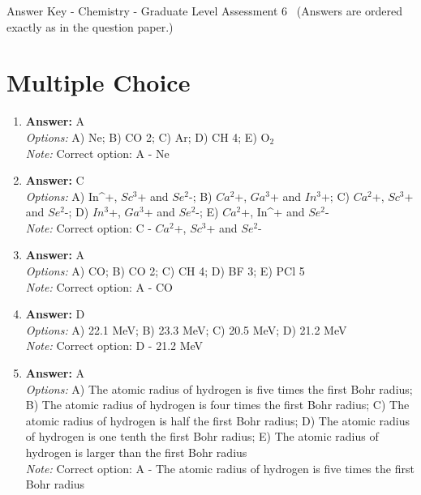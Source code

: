 \documentclass[12pt]{article}
\begin{document}
\begin{center}
Answer Key - Chemistry - Graduate Level Assessment 6 \
\small (Answers are ordered exactly as in the question paper.)
\end{center}

\section*{Multiple Choice}
\begin{enumerate}[label=\arabic*.]
\item \textbf{Answer:} A
\\ \textit{Options:} A) Ne; B) CO 2; C) Ar; D) CH 4; E) O$_{2}$
\\ \textit{Note:} Correct option: A - Ne
\item \textbf{Answer:} C
\\ \textit{Options:} A) In^+, $Sc^3$+ and $Se^2$-; B) $Ca^2$+, $Ga^3$+ and $In^3$+; C) $Ca^2$+, $Sc^3$+ and $Se^2$-; D) $In^3$+, $Ga^3$+ and $Se^2$-; E) $Ca^2$+, In^+ and $Se^2$-
\\ \textit{Note:} Correct option: C - $Ca^2$+, $Sc^3$+ and $Se^2$-
\item \textbf{Answer:} A
\\ \textit{Options:} A) CO; B) CO 2; C) CH 4; D) BF 3; E) PCl 5
\\ \textit{Note:} Correct option: A - CO
\item \textbf{Answer:} D
\\ \textit{Options:} A) 22.1 MeV; B) 23.3 MeV; C) 20.5 MeV; D) 21.2 MeV
\\ \textit{Note:} Correct option: D - 21.2 MeV
\item \textbf{Answer:} A
\\ \textit{Options:} A) The atomic radius of hydrogen is five times the first Bohr radius; B) The atomic radius of hydrogen is four times the first Bohr radius; C) The atomic radius of hydrogen is half the first Bohr radius; D) The atomic radius of hydrogen is one tenth the first Bohr radius; E) The atomic radius of hydrogen is larger than the first Bohr radius
\\ \textit{Note:} Correct option: A - The atomic radius of hydrogen is five times the first Bohr radius
\end{enumerate}
\end{document}

